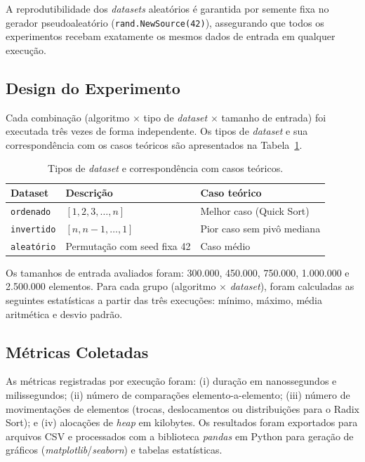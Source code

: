\documentclass[12pt]{article}
\begin{document}
A reprodutibilidade dos \textit{datasets} aleatórios é garantida
por semente fixa no gerador pseudoaleatório
(\texttt{rand.NewSource(42)}), assegurando que todos os experimentos
recebam exatamente os mesmos dados de entrada em qualquer execução.

\subsection{Design do Experimento}

Cada combinação (algoritmo $\times$ tipo de \textit{dataset} $\times$
tamanho de entrada) foi executada três vezes de forma independente.
Os tipos de \textit{dataset} e sua correspondência com os casos
teóricos são apresentados na Tabela~\ref{tab:datasets}.

\begin{table}[ht]
\centering
\caption{Tipos de \textit{dataset} e correspondência com casos teóricos.}
\label{tab:datasets}
\begin{tabular}{lll}
\toprule
\textbf{Dataset} & \textbf{Descrição} & \textbf{Caso teórico} \\
\midrule
\texttt{ordenado}  & $[1, 2, 3, \ldots, n]$         & Melhor caso (Quick Sort) \\
\texttt{invertido} & $[n, n{-}1, \ldots, 1]$        & Pior caso sem pivô mediana \\
\texttt{aleatório} & Permutação com seed fixa 42     & Caso médio \\
\bottomrule
\end{tabular}
\end{table}

Os tamanhos de entrada avaliados foram: 300.000, 450.000, 750.000,
1.000.000 e 2.500.000 elementos. Para cada grupo (algoritmo $\times$
\textit{dataset}), foram calculadas as seguintes estatísticas a
partir das três execuções: mínimo, máximo, média aritmética e
desvio padrão.

\subsection{Métricas Coletadas}

As métricas registradas por execução foram: (i) duração em
nanossegundos e milissegundos; (ii) número de comparações
elemento-a-elemento; (iii) número de movimentações de elementos
(trocas, deslocamentos ou distribuições para o Radix Sort); e
(iv) alocações de \textit{heap} em kilobytes. Os resultados foram
exportados para arquivos CSV e processados com a biblioteca
\textit{pandas} em Python para geração de gráficos
(\textit{matplotlib}/\textit{seaborn}) e tabelas estatísticas.
\end{document}
